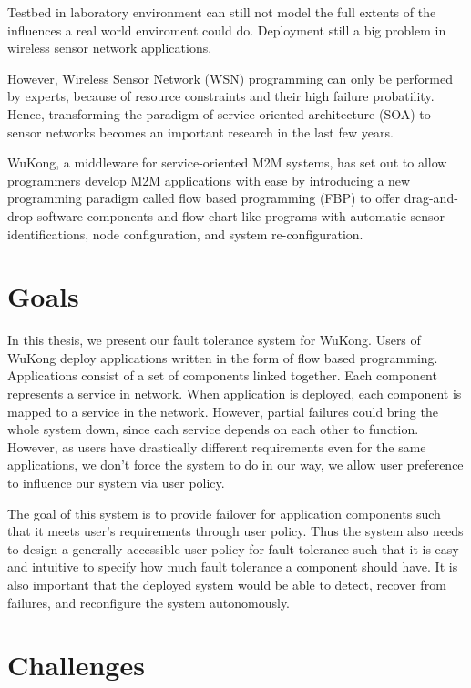 Testbed in laboratory environment can still not model the full extents of the
influences a real world enviroment could do. Deployment still a big problem in
wireless sensor network applications.

However, Wireless Sensor Network (WSN) programming can only be performed by
experts, because of resource constraints and their high failure probatility.
Hence, transforming the paradigm of service-oriented architecture (SOA) to
sensor networks becomes an important research in the last few
years.~\cite{Koutsoukos2007,Hughes2012}

WuKong, a middleware for service-oriented M2M systems, has set out to allow
programmers develop M2M applications with ease by introducing a new
programming paradigm called flow based programming (FBP) to offer drag-and-drop
software components and flow-chart like programs with automatic sensor
identifications, node configuration, and system re-configuration.~\cite{Reijers}



\section{Goals} %

In this thesis, we present our fault tolerance system for WuKong.
Users of WuKong deploy applications written in the form of flow based
programming. Applications consist of a set of components linked together.  Each
component represents a service in network. When application is deployed, each
component is mapped to a service in the network. However, partial failures could
bring the whole system down, since each service depends on each other to
function. However, as users have drastically different requirements even for the
same applications, we don't force the system to do in our way, we allow user
preference to influence our system via user policy. 

The goal of this system is to provide failover for application components such
that it meets user's requirements through user policy. Thus the system also
needs to design a generally accessible user policy for fault tolerance such that
it is easy and intuitive to specify how much fault tolerance a component should
have. It is also important that the deployed system would be able to detect,
  recover from failures, and reconfigure the system autonomously. 


\section{Challenges}

